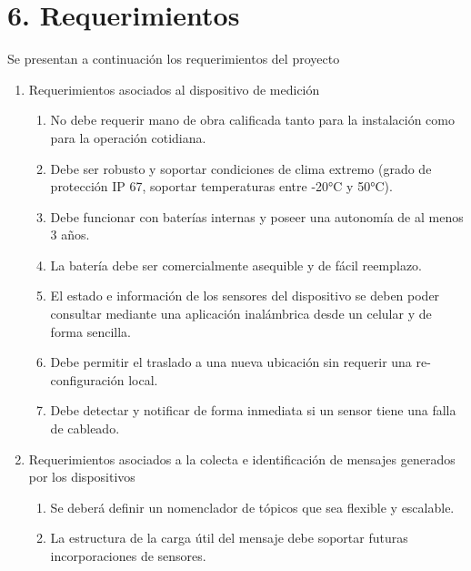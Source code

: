 \documentclass[
11pt, %
]{charter}
\begin{document}
\section{6. Requerimientos}
\label{sec:requerimientos}
Se presentan a continuación los requerimientos del proyecto
\begin{enumerate}
	\item Requerimientos asociados al dispositivo de medición
		\begin{enumerate}
			\item No debe requerir mano de obra calificada tanto para la instalación como para la operación cotidiana.
			\item Debe ser robusto y soportar condiciones de clima extremo (grado de protección IP 67, soportar temperaturas entre -20°C y 50°C).
			\item Debe funcionar con baterías internas y poseer una autonomía de al menos 3 años.
			\item La batería debe ser comercialmente asequible y de fácil reemplazo.
			\item El estado e información de los sensores del dispositivo se deben poder consultar mediante una aplicación inalámbrica desde un celular y de forma sencilla.
			\item Debe permitir el traslado a una nueva ubicación sin requerir una re-configuración local.
			\item Debe detectar y notificar de forma inmediata si un sensor tiene una falla de cableado.
		\end{enumerate}
		
	\item Requerimientos asociados a la colecta e identificación de mensajes generados por los dispositivos
		\begin{enumerate}
			\item Se deberá definir un nomenclador de tópicos que sea flexible y escalable.
			\item La estructura de la carga útil del mensaje debe soportar futuras  incorporaciones de sensores.
		\end{enumerate}


\end{enumerate}
\end{document}
